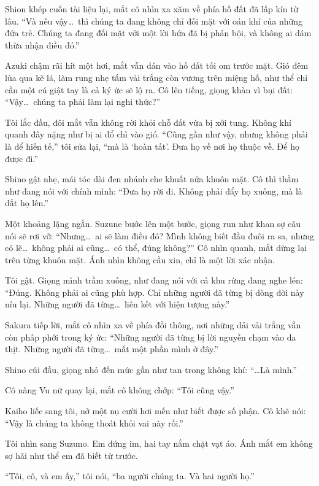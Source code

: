 \documentclass[../main.tex]{subfiles}
\begin{document}
Shion khép cuốn tài liệu lại, mắt cô nhìn xa xăm về phía hố đất đã lấp kín từ lâu. ``Và nếu vậy\dots\ thì chúng ta đang không chỉ đối mặt với oán khí của những đứa trẻ. Chúng ta đang đối mặt với một lời hứa đã bị phản bội, và không ai dám thừa nhận điều đó.''

Azuki chậm rãi hít một hơi, mắt vẫn dán vào hố đất tối om trước mặt. Gió đêm lùa qua kẽ lá, làm rung nhẹ tấm vải trắng còn vương trên miệng hố, như thể chỉ cần một cú giật tay là cả ký ức sẽ lộ ra. Cô lên tiếng, giọng khàn vì bụi đất: ``Vậy\dots\ chúng ta phải làm lại nghi thức?''

Tôi lắc đầu, đôi mắt vẫn không rời khỏi chỗ đất vừa bị xới tung. Không khí quanh đây nặng như bị ai đổ chì vào gió. ``Cũng gần như vậy, nhưng không phải là để hiến tế,'' tôi sửa lại, ``mà là `hoàn tất'. Đưa họ về nơi họ thuộc về. Để họ được đi.''

Shino gật nhẹ, mái tóc dài đen nhánh che khuất nửa khuôn mặt. Cô thì thầm như đang nói với chính mình: ``Đưa họ rời đi. Không phải đẩy họ xuống, mà là dắt họ lên.''

Một khoảng lặng ngắn. Suzune bước lên một bước, giọng run như khan sợ câu nói sẽ rơi vỡ: ``Nhưng\dots\ ai sẽ làm điều đó? Mình không biết đầu đuôi ra sa, nhưng có lẽ\dots\ không phải ai cũng\dots\ có thể, đúng không?'' Cô nhìn quanh, mắt dừng lại trên từng khuôn mặt. Ánh nhìn không cầu xin, chỉ là một lời xác nhận.

Tôi gật. Giọng mình trầm xuống, như đang nói với cả khu rừng đang nghe lén: ``Đúng. Không phải ai cũng phù hợp. Chỉ những người đã từng bị dòng đời này níu lại. Những người đã từng\dots\ liên kết với hiện tượng này.''

Sakura tiếp lời, mắt cô nhìn xa về phía đồi thông, nơi những dải vải trắng vẫn còn phấp phới trong ký ức: ``Những người đã từng bị lời nguyền chạm vào da thịt. Những người đã từng\dots\ mất một phần mình ở đây.''

Shino cúi đầu, giọng nhỏ đến mức gần như tan trong không khí: ``\dots Là mình.''

Cô nàng Vu nữ quay lại, mắt cô không chớp: ``Tôi cũng vậy.''

Kaiho liếc sang tôi, nở một nụ cười hơi mếu như biết được số phận. Cô khẽ nói: ``Vậy là chúng ta không thoát khỏi vai này rồi.''

Tôi nhìn sang Suzuno. Em đứng im, hai tay nắm chặt vạt áo. Ánh mắt em không sợ hãi như thể em đã biết từ trước.

``Tôi, cô, và em ấy,'' tôi nói, ``ba người chúng ta. Và hai người họ.''
\end{document}
